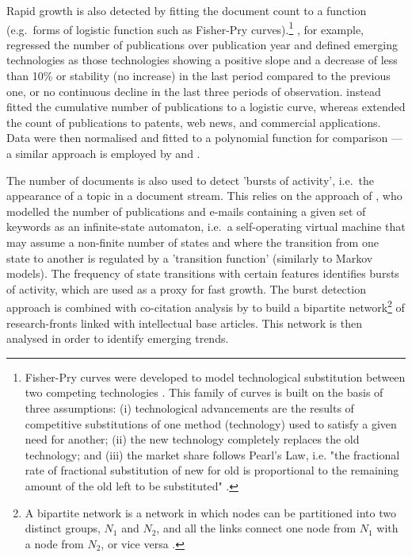 \documentclass[11pt]{article}
\begin{document}
Rapid growth is also detected by fitting the document count to a function (e.g.\ forms of logistic function such as Fisher-Pry curves).\footnote{Fisher-Pry curves were developed to model technological substitution between two competing technologies \citep{Fisher1971}. This family of curves is built on the basis of three assumptions: (i) technological advancements are the results of competitive substitutions of one method (technology) used to satisfy a given need for another; (ii) the new technology completely replaces the old technology; and (iii) the market share follows Pearl's Law, i.e. "the fractional rate of fractional substitution of new for old is proportional to the remaining amount of the old left to be substituted" \citep[p. 75]{Fisher1971}.} \cite{Bengisu2003}, for example, regressed the number of publications over publication year and defined emerging technologies as those technologies showing a positive slope and a decrease of less than 10\% or stability (no increase) in the last period compared to the previous one, or no continuous decline in the last three periods of observation. \cite{Ho2014} instead fitted the cumulative number of publications to a logistic curve, whereas \cite{Abercrombie2012} extended the count of publications to patents, web news, and commercial applications. Data were then normalised and fitted to a polynomial function for comparison --- a similar approach is employed by \cite{Jarvenpaa2011} and \cite{Jun2014}. 

The number of documents is also used to detect 'bursts of activity', i.e.\ the appearance of a topic in a document stream. This relies on the approach of \cite{Kleinberg2002}, who modelled the number of publications and e-mails containing a given set of keywords as an infinite-state automaton, i.e.\ a self-operating virtual machine that may assume a non-finite number of states and where the transition from one state to another is regulated by a 'transition function' (similarly to Markov models). The frequency of state transitions with certain features identifies bursts of activity, which are used as a proxy for fast growth. The burst detection approach is combined with co-citation analysis by \cite{Chen2006} to build a bipartite network\footnote{A bipartite network is a network in which nodes can be partitioned into two distinct groups, $N_1$ and $N_2$, and all the links connect one node from $N_1$ with a node from $N_2$, or vice versa \citep{Wassermann1994}.} of research-fronts linked with intellectual base articles. This network is then analysed in order to identify emerging trends.
\end{document}
